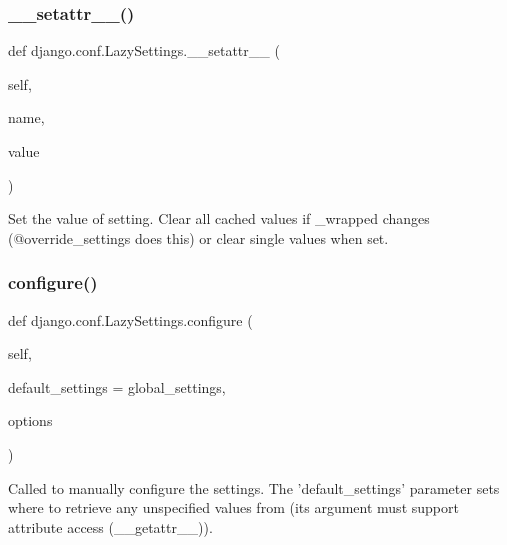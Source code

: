 \subsubsection{\texorpdfstring{\+\_\+\+\_\+setattr\+\_\+\+\_\+()}{\_\_setattr\_\_()}}
{\footnotesize\ttfamily def django.\+conf.\+Lazy\+Settings.\+\_\+\+\_\+setattr\+\_\+\+\_\+ (\begin{DoxyParamCaption}\item[{}]{self,  }\item[{}]{name,  }\item[{}]{value }\end{DoxyParamCaption})}

\begin{DoxyVerb}Set the value of setting. Clear all cached values if _wrapped changes
(@override_settings does this) or clear single values when set.
\end{DoxyVerb}
 \mbox{\label{classdjango_1_1conf_1_1_lazy_settings_a210e8d008e67658be7e59d0427056da0}} 
\subsubsection{\texorpdfstring{configure()}{configure()}}
{\footnotesize\ttfamily def django.\+conf.\+Lazy\+Settings.\+configure (\begin{DoxyParamCaption}\item[{}]{self,  }\item[{}]{default\+\_\+settings = {\ttfamily global\+\_\+settings},  }\item[{}]{options }\end{DoxyParamCaption})}

\begin{DoxyVerb}Called to manually configure the settings. The 'default_settings'
parameter sets where to retrieve any unspecified values from (its
argument must support attribute access (__getattr__)).
\end{DoxyVerb}
 \mbox{\label{classdjango_1_1conf_1_1_lazy_settings_a7ed7bcef467d27210611e7d9dceeac14}} 

